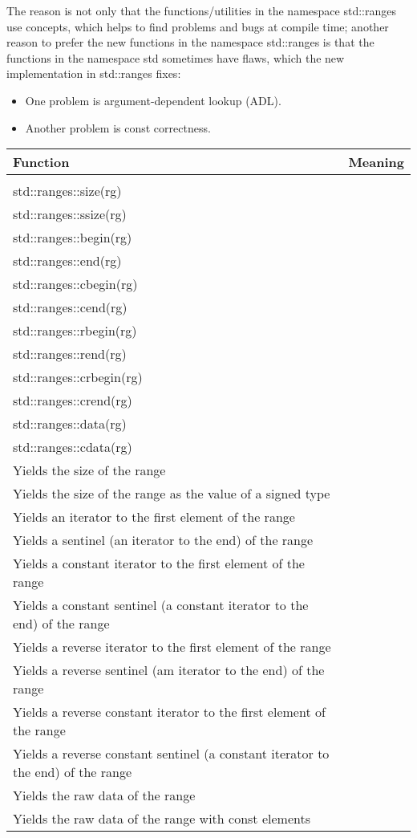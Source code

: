 The reason is not only that the functions/utilities in the namespace std::ranges use concepts, which helps to find problems and bugs at compile time; another reason to prefer the new functions in the namespace std::ranges is that the functions in the namespace std sometimes have flaws, which the new implementation in std::ranges fixes:

\begin{itemize}
\item
One problem is argument-dependent lookup (ADL).

\item
Another problem is const correctness.
\end{itemize}

\begin{longtable}[c]{|l|l|}
	\hline
	\textbf{Function} &
	\textbf{Meaning} \\ \hline
	\endfirsthead
	\endhead
	\begin{tabular}[c]{@{}l@{}}std::ranges::empty(rg)\\ std::ranges::size(rg)\\ std::ranges::ssize(rg)\\ std::ranges::begin(rg)\\ std::ranges::end(rg)\\ std::ranges::cbegin(rg)\\ std::ranges::cend(rg)\\ std::ranges::rbegin(rg)\\ std::ranges::rend(rg)\\ std::ranges::crbegin(rg)\\ std::ranges::crend(rg)\\ std::ranges::data(rg)\\ std::ranges::cdata(rg)\end{tabular} &
	\begin{tabular}[c]{@{}l@{}}Yields whether the range is empty\\ Yields the size of the range\\ Yields the size of the range as the value of a signed type\\ Yields an iterator to the first element of the range\\ Yields a sentinel (an iterator to the end) of the range\\ Yields a constant iterator to the first element of the range\\ Yields a constant sentinel (a constant iterator to the end) of the range\\ Yields a reverse iterator to the first element of the range\\ Yields a reverse sentinel (am iterator to the end) of the range\\ Yields a reverse constant iterator to the first element of the range\\ Yields a reverse constant sentinel (a constant iterator to the end) of the range\\ Yields the raw data of the range\\ Yields the raw data of the range with const elements\end{tabular} \\ \hline
\end{longtable}

